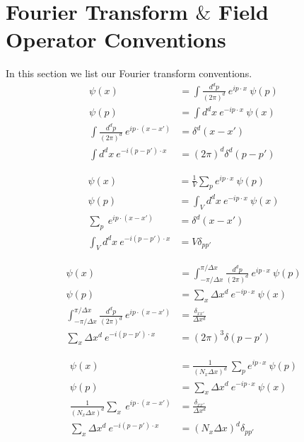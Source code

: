 \section{Fourier Transform $\&$ Field Operator Conventions}\label{sec:ft-conv}
In this section we list our Fourier transform conventions. \\

\begin{align}
\psi(x) & = \int \frac{d^d p}{(2 \pi)^d} ~ e^{i p\cdot x} ~ \psi(p) \\
\psi(p) & = \int d^d x ~ e^{-i p\cdot x} ~ \psi(x) \\
\int \frac{d^d p}{(2 \pi)^d} ~ e^{i p\cdot (x-x')} & = \delta^d(x-x') \\
\int d^d x ~ e^{-i (p - p') \cdot x} & = (2\pi)^d\delta^d(p-p') 
\end{align}

\begin{align}
\psi(x) & = \frac{1}{V} \sum_p e^{i p\cdot x} ~ \psi(p) \\
\psi(p) & = \int_V d^d x ~ e^{-i p\cdot x} ~ \psi(x) \\
\sum_p ~ e^{i p\cdot (x-x')} & = \delta^d(x-x') \\
\int_V d^d x ~ e^{-i (p - p') \cdot x} & = V \delta_{p p'} 
\end{align}

\begin{align}
\psi(x) & =  \int_{-\pi/\Delta x}^{\pi/\Delta x} \frac{d^d p}{(2\pi)^d} ~ e^{i p\cdot x} ~ \psi(p) \\
\psi(p) & = \sum_x \Delta x^d ~ e^{-i p\cdot x} ~ \psi(x) \\
\int_{-\pi/\Delta x}^{\pi/\Delta x} \frac{d^d p}{(2\pi)^d} ~ e^{i p\cdot (x-x')} & = \frac{\delta_{x x'}}{\Delta x^d} \\
\sum_x \Delta x^d ~ e^{-i (p - p') \cdot x} & = (2\pi)^3 \delta(p - p') 
\end{align}

\begin{align}
\psi(x) & = \frac{1}{(N_x \Delta x)^d} ~ \sum_p e^{i p\cdot x} ~ \psi(p) \\
\psi(p) & = \sum_x \Delta x^d ~ e^{-i p\cdot x} ~ \psi(x) \\
\frac{1}{(N_x \Delta x)^d}\sum_x ~ e^{i p \cdot (x -x')} & = \frac{ \delta_{x x'}}{\Delta x^d} \\
\sum_x \Delta x^d ~ e^{-i (p-p')\cdot x} & = (N_x \Delta x)^d \delta_{p p'} 
\end{align}

